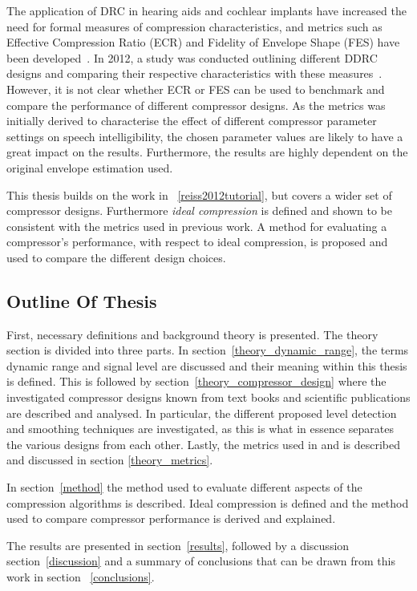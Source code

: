 \documentclass[../main2.tex]{subfiles}
\begin{document}
The application of DRC in hearing aids and cochlear implants have increased the need for formal measures of compression characteristics, and metrics such as Effective Compression Ratio (ECR) and Fidelity of Envelope Shape (FES) have been developed~\cite{stone1992syllabic}\cite{stone2007quantifying}. In 2012, a study was conducted outlining different DDRC designs and comparing their respective characteristics with these measures~\cite{reiss2012tutorial}. However, it is not clear whether ECR or FES can be used to benchmark and compare the performance of different compressor designs. As the metrics was initially derived to characterise the effect of different compressor parameter settings on speech intelligibility, the chosen parameter values are likely to have a great impact on the results. Furthermore, the results are highly dependent on the original envelope estimation used.

This thesis builds on the work in ~\ref{reiss2012tutorial}, but covers a wider set of compressor designs. Furthermore \emph{ideal compression} is defined and shown to be consistent with the metrics used in previous work. A method for evaluating a compressor's performance, with respect to ideal compression, is proposed and used to compare the different design choices.
\subsection{Outline Of Thesis}
First, necessary definitions and background theory is presented. The theory section is divided into three parts. In section~\ref{theory_dynamic_range}, the terms dynamic range and signal level are discussed and their meaning within this thesis is defined. This is followed by section~\ref{theory_compressor_design} where the investigated compressor designs known from text books and scientific publications are described and analysed. In particular, the different proposed level detection and smoothing techniques are investigated, as this is what in essence separates the various designs from each other. Lastly, the metrics used in \cite{stone1992syllabic}\cite{stone2007quantifying} and \cite{reiss2012tutorial} is described and discussed in section \ref{theory_metrics}.

In section~\ref{method} the method used to evaluate different aspects of the compression algorithms is described. Ideal compression is defined and the method used to compare compressor performance is derived and explained.

The results are presented in section~\ref{results}, followed by a discussion section~\ref{discussion} and a summary of conclusions that can be drawn from this work in section ~\ref{conclusions}.
\end{document}
